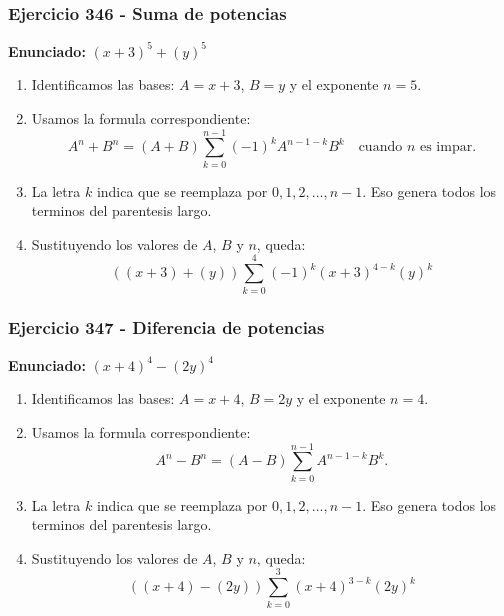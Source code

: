 \documentclass[11pt,a4paper]{article}
\begin{document}
\subsubsection*{Ejercicio 346 - Suma de potencias}
\textbf{Enunciado:} $ \left(x + 3\right)^{5}+\left(y\right)^{5} $\par
\begin{enumerate}[leftmargin=2em]
\item Identificamos las bases: \(A=x + 3\), \(B=y\) y el exponente \(n=5\).
\item Usamos la formula correspondiente: \[A^n+B^n=(A+B)\sum_{k=0}^{n-1}(-1)^kA^{n-1-k}B^k\quad\text{cuando }n\text{ es impar}.\]
\item La letra \(k\) indica que se reemplaza por \(0,1,2,\ldots,n-1\). Eso genera todos los terminos del parentesis largo.
\item Sustituyendo los valores de \(A\), \(B\) y \(n\), queda: \[\boxed{\left(\left(x + 3\right)+\left(y\right)\right)\sum_{k=0}^{4}(-1)^k\left(x + 3\right)^{4-k}\left(y\right)^k}\]
\end{enumerate}

\vspace{0.2cm}
\subsubsection*{Ejercicio 347 - Diferencia de potencias}
\textbf{Enunciado:} $ \left(x + 4\right)^{4}-\left(2 y\right)^{4} $\par
\begin{enumerate}[leftmargin=2em]
\item Identificamos las bases: \(A=x + 4\), \(B=2 y\) y el exponente \(n=4\).
\item Usamos la formula correspondiente: \[A^n-B^n=(A-B)\sum_{k=0}^{n-1}A^{n-1-k}B^k.\]
\item La letra \(k\) indica que se reemplaza por \(0,1,2,\ldots,n-1\). Eso genera todos los terminos del parentesis largo.
\item Sustituyendo los valores de \(A\), \(B\) y \(n\), queda: \[\boxed{\left(\left(x + 4\right)-\left(2 y\right)\right)\sum_{k=0}^{3}\left(x + 4\right)^{3-k}\left(2 y\right)^k}\]
\end{enumerate}

\vspace{0.2cm}
\end{document}
